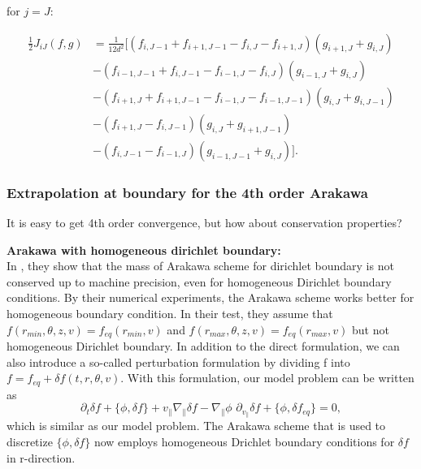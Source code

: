 for $j=J$:

\begin{equation}
\begin{aligned}
\frac{1}{2}J_{iJ} (f,g) &=\frac{1}{12d^2}[(f_{i,J-1}+f_{i+1,J-1}-f_{i,J}-f_{i+1,J})(g_{i+1,J}+g_{i,J})\\
&-(f_{i-1,J-1}+f_{i,J-1}-f_{i-1,J}-f_{i,J})(g_{i-1,J}+g_{i,J})\\
&-(f_{i+1,J}+f_{i+1,J-1}-f_{i-1,J}-f_{i-1,J-1})(g_{i,J}+g_{i,J-1})\\
&-(f_{i+1,J}-f_{i,J-1})(g_{i,J}+g_{i+1,J-1})\\
&-(f_{i,J-1}-f_{i-1,J})(g_{i-1,J-1}+g_{i,J})].
\end{aligned}
\end{equation}




\subsubsection{Extrapolation at boundary for the 4th order Arakawa}

It is easy to get 4th order convergence, but how about conservation properties?

\textbf{Arakawa with homogeneous dirichlet boundary:}\\
In \cite{crouseilles2018exponential}, they show that the mass of Arakawa scheme for dirichlet boundary is not conserved up to machine precision, even for homogeneous Dirichlet boundary conditions. By their numerical experiments, the Arakawa scheme works better for homogeneous boundary condition. In their test, they assume that $f(r_{min}, \theta,z,v)=f_{eq}(r_{min},v)$ and $f(r_{max}, \theta,z,v)=f_{eq}(r_{max},v)$ but not homogeneous Dirichlet boundary. In addition to the direct formulation, we can also introduce a so-called perturbation formulation by dividing f into $f=f_{eq}+\delta f(t,r,\theta,v)$. With this formulation, our model problem can be written as 
\begin{equation}
 \partial_t \delta f + \{\phi, \delta f \} + v_\parallel \nabla_\parallel \delta f - \nabla_\parallel \phi\,\, \partial_{v_\parallel} \delta f + \{\phi, \delta f_{eq} \}= 0,
\end{equation} 
which is similar as our model problem. The Arakawa scheme that is used to discretize $\{\phi, \delta f \}$ now employs homogeneous Drichlet boundary conditions for $\delta f$ in r-direction.